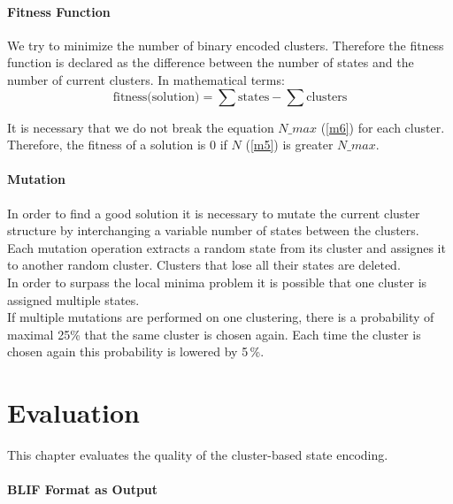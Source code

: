 \subsubsection{Fitness Function}
\label{subsubsec:FitnessFunction}

We try to minimize the number of binary encoded clusters. Therefore the fitness function is declared as the difference between the number of states and the number of current clusters. In mathematical terms: 
\begin{equation}
\text{fitness(solution)} = \sum{\text{states}} - \sum{\text{clusters}}
\end{equation}

It is necessary that we do not break the equation  $N\_max$ (\ref{m6}) for each cluster. Therefore, the fitness of a solution is 0 if $ N $ (\ref{m5}) is greater $N\_max$.

\subsubsection{Mutation}
\label{subsubsec:Mutation}

In order to find a good solution it is necessary to mutate the current cluster structure by interchanging a variable number of states between the clusters. \\
Each mutation operation extracts a random state from its cluster and assignes it to another random cluster. Clusters that lose all their states are deleted. \\
In order to surpass the local minima problem it is possible that one cluster is assigned multiple states.\\
If multiple mutations are performed on one clustering, there is a probability of maximal 25\% that the same cluster is chosen again. Each time the cluster is chosen again this probability is lowered by 5\,\%.


\chapter{Evaluation}
\label{cha:Evaluation}

This chapter evaluates the quality of the cluster-based state encoding.

\subsubsection{BLIF Format as Output}
\label{subsubsec:BLIFOutput}


